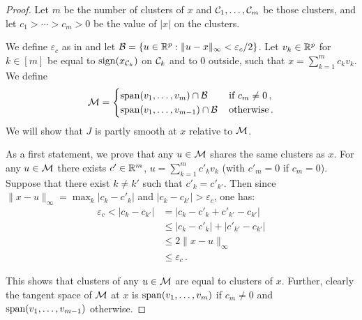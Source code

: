 \begin{proof}
	Let $m$ be the number of clusters of $x$ and $\mathcal{C}_1, \ldots, \mathcal{C}_m$ be those clusters, and let $c_1 > \cdots > c_m > 0$ be the  value of  $\lvert x \rvert$ on the clusters.

	We define $\varepsilon_c$ as in  and
	let $\mathcal{B} = \{u \in \mathbb{R}^p: \lVert u - x \rVert_\infty < \varepsilon_c / 2\}$.
	Let $v_k \in \mathbb{R}^p$ for $k \in [m]$  be equal to $\operatorname{sign}(x_{\mathcal{C}_k})$ on $\mathcal{C}_k$ and to 0 outside, such that $x = \sum_{k=1}^m c_k v_k$.
	We define
	\begin{equation*}
		\mathcal{M} =
		\begin{cases}
			\operatorname{span}(v_1, \ldots, v_m) \cap \mathcal{B} \,     & \text{if } c_m \neq 0 \, , \\
			\operatorname{span}(v_1, \ldots, v_{m-1}) \cap \mathcal{B} \, & \text{otherwise} \, .
		\end{cases}
	\end{equation*}
	We will show that $J$ is partly smooth at $x$ relative to $\mathcal{M}$.

	As a first statement, we prove that any $u\in\mathcal{M}$ shares the same clusters as $x$. For any $u\in\mathcal{M}$ there exists $c' \in \mathbb{R}^m$, $u = \sum_{k=1}^m c'_k v_k$ (with $c'_m = 0$ if $c_m = 0$).
	Suppose that there exist $k \neq k'$ such that $c'_k = c'_{k'}$.
	Then since $\lVert x - u \rVert_\infty = \max_k |c_k - c'_k|$ and $|c_k - c_{k'}| > \varepsilon_c$, one has:
	\begin{align*}
		\varepsilon_c < |c_k - c_{k'}|
		 & = |c_k - c'_k + c'_{k'} - c_{k'}|      \\
		 & \leq |c_k - c'_k| + |c'_{k'} - c_{k'}| \\
		 & \leq 2 \lVert x - u \rVert_\infty      \\
		 & \leq  \varepsilon_c \, .
	\end{align*}

	This shows that clusters of any $u \in \mathcal{M}$ are equal to clusters of $x$.
	Further, clearly the tangent space of $\mathcal{M}$ at $x$ is $\operatorname{span}(v_1, \hdots, v_m)$ if $c_m \neq 0$ and $\operatorname{span}(v_1, \ldots, v_{m-1})$ otherwise.


\end{proof}

